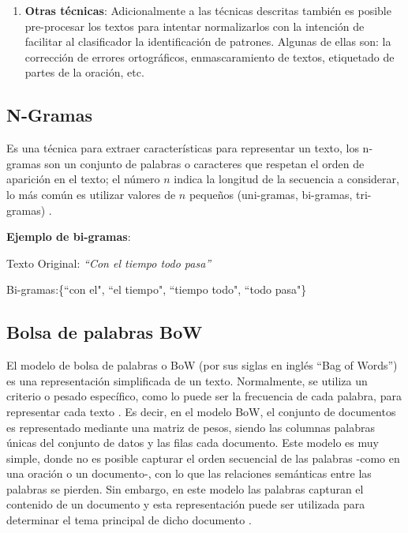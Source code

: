 \begin{enumerate}
\item  \textbf{Otras técnicas}: Adicionalmente a  las técnicas descritas también es posible pre-procesar los textos para intentar normalizarlos con la intención de facilitar al clasificador la identificación de patrones. Algunas de ellas son: la corrección de errores ortográficos, enmascaramiento de textos, etiquetado de partes de la oración, etc.

\end{enumerate}


\subsection{N-Gramas}
Es una técnica para extraer características para representar un texto, los n-gramas son un conjunto de palabras o caracteres que respetan el orden de aparición en el texto; el número $n$ indica la longitud de la secuencia a considerar, lo más común es utilizar valores de $n$ pequeños (uni-gramas, bi-gramas, tri-gramas) \citep{kowsari2019text}. 

\textbf{Ejemplo de bi-gramas}: 

Texto Original: \textit{``Con el tiempo todo pasa''}

Bi-gramas:\{``con el", ``el tiempo", ``tiempo todo", ``todo pasa"\}


\subsection{Bolsa de palabras BoW}
El modelo de bolsa de palabras o BoW (por sus siglas en inglés ``Bag of Words'') es una representación simplificada de un texto. Normalmente, se utiliza un criterio o pesado específico, como lo puede ser la frecuencia de cada palabra, para representar cada texto . Es decir, en el modelo BoW, el conjunto de documentos es representado mediante una matriz de pesos, siendo las columnas palabras únicas del conjunto de datos y las filas cada documento. Este modelo es muy simple, donde no es posible capturar el orden secuencial de las palabras -como en una oración o un documento-, con lo que las relaciones semánticas entre las palabras se pierden. Sin embargo, en este modelo las palabras capturan el contenido de un documento y esta representación puede ser utilizada para determinar el tema principal de dicho documento \citep{kowsari2019text}.




